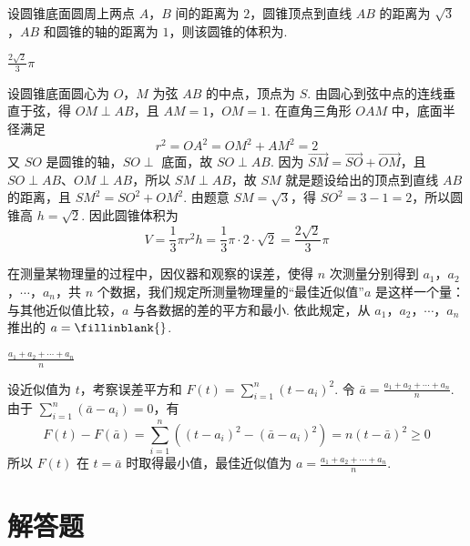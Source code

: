 \begin{problem}
设圆锥底面圆周上两点 \(A\)，\(B\) 间的距离为 \(2\)，圆锥顶点到直线 \(AB\) 的距离为 \(\sqrt{3} \)，\(AB\) 和圆锥的轴的距离为 \(1\)，则该圆锥的体积为\fillinblank{}.
\end{problem}

\begin{answer}
\(\frac{2\sqrt{2}}{3}\pi\)
\end{answer}

\begin{solution}
设圆锥底面圆心为 \(O\)，\(M\) 为弦 \(AB\) 的中点，顶点为 \(S\). 由圆心到弦中点的连线垂直于弦，得 \(OM\perp AB\)，且 \(AM=1\)，\(OM=1\).
在直角三角形 \(OAM\) 中，底面半径满足
\[
r^2=OA^2=OM^2+AM^2=2
\]
又 \(SO\) 是圆锥的轴，\(SO\perp\) 底面，故 \(SO\perp AB\). 因为 \(\overrightarrow{SM}=\overrightarrow{SO}+\overrightarrow{OM}\)，且 \(SO\perp AB\)、\(OM\perp AB\)，所以 \(SM\perp AB\)，故 \(SM\) 就是题设给出的顶点到直线 \(AB\) 的距离，且 \(SM^2=SO^2+OM^2\).
由题意 \(SM=\sqrt{3}\)，得 \(SO^2=3-1=2\)，所以圆锥高 \(h=\sqrt{2}\). 因此圆锥体积为
\[
V=\frac13\pi r^2h=\frac13\pi\cdot2\cdot\sqrt{2}
=\frac{2\sqrt{2}}{3}\pi
\]
\end{solution}

\begin{problem}
在测量某物理量的过程中，因仪器和观察的误差，使得 \(n\) 次测量分别得到 \(a_{1}\)，\(a_{2}\)，\(\cdots\)，\(a_{n}\)，共 \(n\) 个数据，我们规定所测量物理量的“最佳近似值”\(a\) 是这样一个量：与其他近似值比较，\(a\) 与各数据的差的平方和最小. 依此规定，从 \(a_{1}\)，\(a_{2}\)，\(\cdots\)，\(a_{n}\) 推出的 \(a =\fillinblank{}\).
\end{problem}

\begin{answer}
\(\frac{a_1+a_2+\cdots+a_n}{n}\)
\end{answer}

\begin{solution}
设近似值为 \(t\)，考察误差平方和 \(F(t)=\sum_{i=1}^{n}(t-a_i)^2\). 令 \(\bar a=\frac{a_1+a_2+\cdots+a_n}{n}\).
由于 \(\sum_{i=1}^{n}(\bar a-a_i)=0\)，有
\[
F(t)-F(\bar a)
=\sum_{i=1}^{n}\left((t-a_i)^2-(\bar a-a_i)^2\right)
=n(t-\bar a)^2\geqslant0
\]
所以 \(F(t)\) 在 \(t=\bar a\) 时取得最小值，最佳近似值为 \(a=\frac{a_1+a_2+\cdots+a_n}{n}\).
\end{solution}

\section{解答题}

